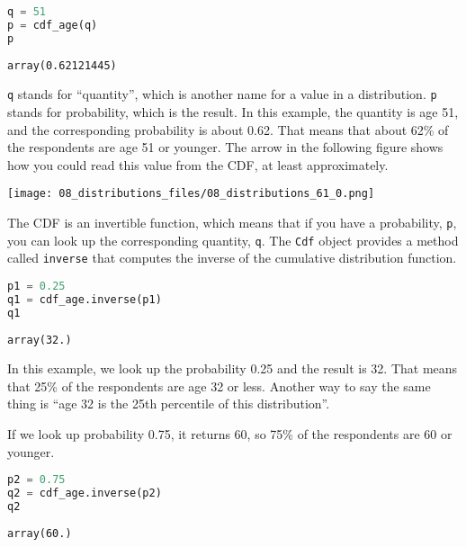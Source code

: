 \begin{lstlisting}[language=Python,style=source]
q = 51
p = cdf_age(q)
p
\end{lstlisting}

\begin{lstlisting}[style=output]
array(0.62121445)
\end{lstlisting}

\passthrough{\lstinline!q!} stands for ``quantity'', which is another
name for a value in a distribution. \passthrough{\lstinline!p!} stands
for probability, which is the result. In this example, the quantity is
age 51, and the corresponding probability is about 0.62. That means that
about 62\% of the respondents are age 51 or younger. The arrow in the
following figure shows how you could read this value from the CDF, at
least approximately.



\begin{center}
\texttt{[image: 08\_distributions\_files/08\_distributions\_61\_0.png]}
\end{center}

The CDF is an invertible function, which means that if you have a
probability, \passthrough{\lstinline!p!}, you can look up the
corresponding quantity, \passthrough{\lstinline!q!}. The
\passthrough{\lstinline!Cdf!} object provides a method called
\passthrough{\lstinline!inverse!} that computes the inverse of the
cumulative distribution function.

\begin{lstlisting}[language=Python,style=source]
p1 = 0.25
q1 = cdf_age.inverse(p1)
q1
\end{lstlisting}

\begin{lstlisting}[style=output]
array(32.)
\end{lstlisting}

In this example, we look up the probability 0.25 and the result is 32.
That means that 25\% of the respondents are age 32 or less. Another way
to say the same thing is ``age 32 is the 25th percentile of this
distribution''.

If we look up probability 0.75, it returns 60, so 75\% of the
respondents are 60 or younger.

\begin{lstlisting}[language=Python,style=source]
p2 = 0.75
q2 = cdf_age.inverse(p2)
q2
\end{lstlisting}

\begin{lstlisting}[style=output]
array(60.)
\end{lstlisting}

